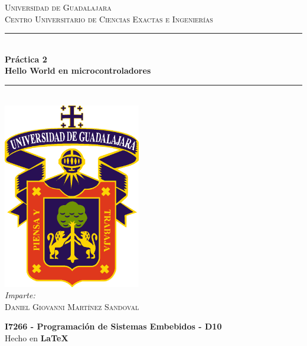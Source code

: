 \documentclass[10pt,letterpaper]{article}
\newcommand{\HRule}{\rule{\linewidth}{0.5mm}} %
\begin{document}

\begin{titlepage}
    \center
    
    \textsc{\LARGE Universidad de Guadalajara}\\[0.2cm] %
    \textsc{Centro Universitario de Ciencias Exactas e Ingenierías}\\[1cm]
    
    \HRule \\[0.3cm]
    { 
        \LARGE \textbf{Práctica 2} \\[0.3cm]
        \large \textbf{Hello World en microcontroladores} \\[0.3cm]
    }
    \HRule \\[2cm]
    
    \includegraphics[width=6cm]{assets/logo_udg_color.eps}\\[1.25cm] %
    
    \center
    \vspace{1cm}
    \emph{Imparte:} \\ %
    \textsc{Daniel Giovanni Martínez Sandoval} 
    
    \vfill
    \textbf{I7266 - Programación de Sistemas Embebidos - D10} \\
    Hecho en \textbf{\LaTeX}	
\end{titlepage}



\end{document}
